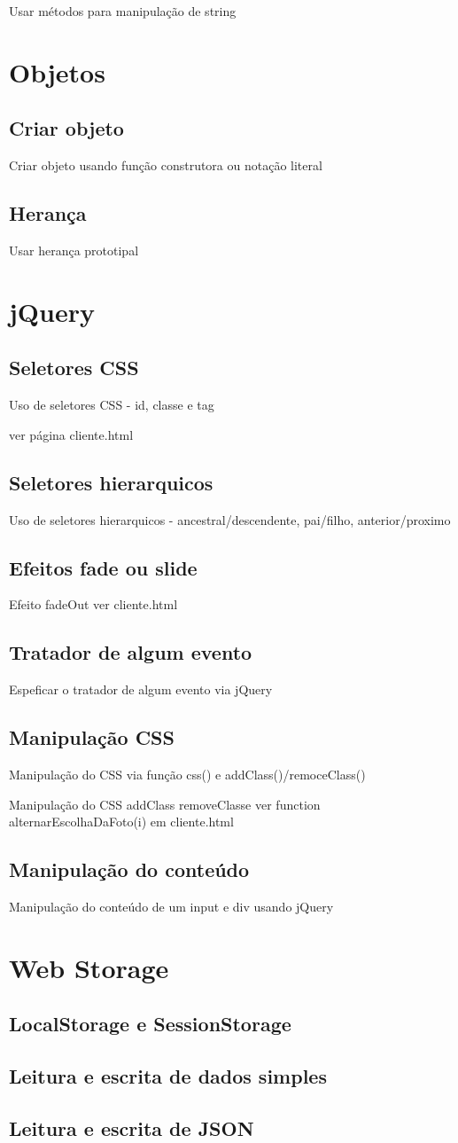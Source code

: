 Usar métodos para manipulação de string


\section{Objetos}
\subsection{Criar objeto}
Criar objeto usando função construtora ou notação literal


\subsection{Herança}
Usar herança prototipal


\section{jQuery}
\subsection{Seletores CSS}
Uso de seletores CSS - id, classe e tag
	
	ver página cliente.html


\subsection{Seletores hierarquicos}
Uso de seletores hierarquicos - ancestral/descendente, pai/filho, anterior/proximo
\subsection{Efeitos fade ou slide}

Efeito fadeOut ver cliente.html


\subsection{Tratador de algum evento}
Espeficar o tratador de algum evento via jQuery
\subsection{Manipulação CSS}
Manipulação do CSS via função css() e addClass()/remoceClass()

Manipulação do CSS addClass removeClasse ver function alternarEscolhaDaFoto(i) em cliente.html


\subsection{Manipulação do conteúdo}
Manipulação do conteúdo de um input e div usando jQuery

\section{Web Storage }
\subsection{LocalStorage e SessionStorage}
\subsection{Leitura e escrita de dados simples}
\subsection{Leitura e escrita de JSON}
